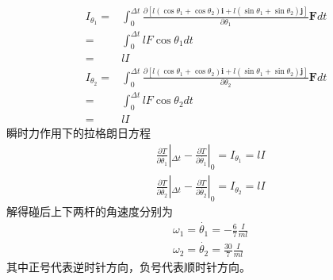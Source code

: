 \documentclass[10pt,a4paper]{article}
\begin{document}
\begin{align*}
I_{\theta_1} =&\int_0^{\Delta t}\frac{\partial[l(\cos\theta_1+\cos\theta_2)\bm{i}+l(\sin\theta_1+\sin\theta_2)\bm{j}]}{\partial\theta_1}\bm{F}dt\\
=&\int_0^{\Delta t}lF\cos\theta_1dt\\
=&lI\\
I_{\theta_2} =&\int_0^{\Delta t}\frac{\partial[l(\cos\theta_1+\cos\theta_2)\bm{i}+l(\sin\theta_1+\sin\theta_2)\bm{j}]}{\partial\theta_2}\bm{F}dt\\
=&\int_0^{\Delta t}lF\cos\theta_2dt\\
=&lI
\end{align*}
瞬时力作用下的拉格朗日方程
\begin{align*}
&\frac{\partial T}{\partial\dot{\theta_1}}|_{\Delta t}-\frac{\partial T}{\partial\dot{\theta_1}}|_{0} = I_{\theta_1} = lI\\
&\frac{\partial T}{\partial\dot{\theta_2}}|_{\Delta t}-\frac{\partial T}{\partial\dot{\theta_2}}|_{0} = I_{\theta_2} = lI
\end{align*}
解得碰后上下两杆的角速度分别为
\begin{align*}
&\omega_1 = \dot{\theta_1} = -\frac{6}{7}\frac{I}{ml}\\
&\omega_2 = \dot{\theta_2} = \frac{30}{7}\frac{I}{ml}
\end{align*}
其中正号代表逆时针方向，负号代表顺时针方向。
\end{document}

